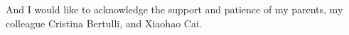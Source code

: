 
\begin{acknowledgements}


And I would like to acknowledge the support and patience of my parents, my colleague Cristina Bertulli, and Xiaohao Cai. 


\end{acknowledgements}
